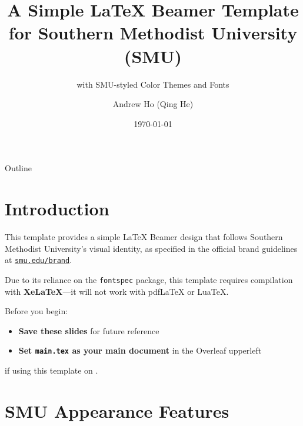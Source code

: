 \documentclass[12pt, aspectratio=169]{beamer}
\title[SMU Beamer Template]{A Simple \LaTeX{} Beamer Template for Southern Methodist University (SMU)}
\subtitle{with SMU-styled Color Themes and Fonts}
\author[Andrew Qing He]{Andrew Ho (Qing He)}
\institute[SMU Dept. Math]{Southern Methodist University, Department of Mathematics}
\date{\today}
\begin{document}
\begin{frame}[plain]
\titlepage
\end{frame}

\begin{frame}{Outline}
\tableofcontents
\end{frame}



\section{Introduction}

\begin{frame}{\insertsection}
\tableofcontents[currentsection]
\end{frame}

\begin{frame}{\insertsection}

This template provides a simple {\serif\LaTeX{}} Beamer design that follows Southern Me\-tho\-dist University's visual identity, as specified in the official brand guidelines at \href{https://www.smu.edu/brand}{\texttt{smu.edu/brand}}.

Due to its reliance on the \texttt{fontspec} package, this template requires compilation with \textbf{XeLaTeX}—it will not work with pdfLaTeX or LuaTeX.

Before you begin:
\begin{itemize}
    \item \textbf{\color{SMUSalmon}Save these slides} for future reference
    \item \textbf{\color{SMUSalmon}Set \texttt{main.tex} as your main document} in the Overleaf upperleft  
\end{itemize}
if using this template on .
\end{frame}


\section{SMU Appearance Features}
\end{document}
